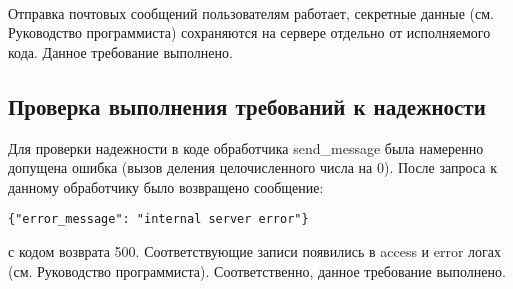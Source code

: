 \documentclass[testmethods]{espd}
\begin{document}
\paragraph{} %
Отправка почтовых сообщений пользователям работает, секретные данные (см. Руководство программиста) сохраняются на сервере отдельно от исполняемого кода. Данное требование выполнено.

\subsection{Проверка выполнения требований к надежности}
Для проверки надежности в коде обработчика send\_message была намеренно допущена ошибка (вызов деления целочисленного числа на 0). После запроса к данному обработчику было возвращено сообщение:

\begin{verbatim}
{"error_message": "internal server error"}
\end{verbatim}

с кодом возврата 500. Соответствующие записи появились в access и error логах (см. Руководство программиста). Соответственно, данное требование выполнено.


\end{document}
